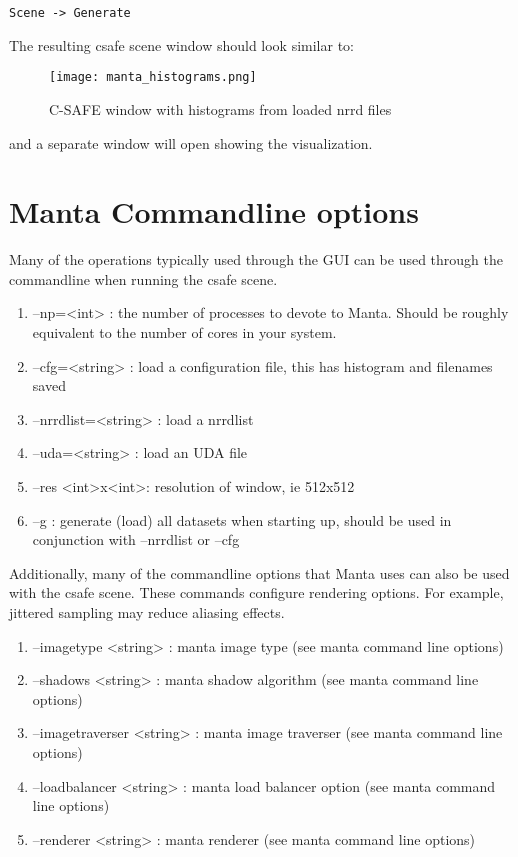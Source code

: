 \begin{Verbatim}[fontsize=\footnotesize]
  Scene -> Generate
\end{Verbatim}

The resulting csafe scene window should look similar to:

\begin{figure}[htbp]
  \center
  \texttt{[image: manta\_histograms.png]}
  \caption{C-SAFE window with histograms from loaded nrrd files}
  \label{fig:manta_histograms}
\end{figure}

and a separate window will open showing the visualization. 

\section{Manta Commandline options} 
Many of the operations typically used through the GUI can be used through the commandline when running the csafe scene.

\begin{enumerate}

\item
--np=<int>  : the number of processes to devote to Manta. Should be roughly equivalent to the number of cores in your system.
\item
--cfg=<string>  : load a configuration file, this has histogram and filenames saved
\item
--nrrdlist=<string>  : load a nrrdlist
\item
--uda=<string>  : load an UDA file
\item
--res <int>x<int>: resolution of window, ie 512x512
\item
--g  : generate (load) all datasets when starting up, should be used in conjunction with --nrrdlist or --cfg

\end{enumerate}

Additionally, many of the commandline options that Manta uses can also be used with the csafe scene.  These commands configure rendering options.  For example, jittered sampling may reduce aliasing effects.

\begin{enumerate}

\item
--imagetype <string> : manta image type (see manta command line options)
\item
--shadows <string> : manta shadow algorithm (see manta command line options)
\item
--imagetraverser <string> : manta image traverser (see manta command line options)
\item
--loadbalancer <string> : manta load balancer option (see manta command line options)
\item
--renderer <string> : manta renderer (see manta command line options)


\end{enumerate}

